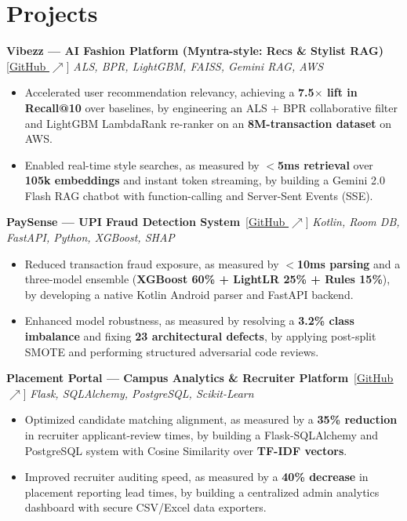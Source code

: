 \documentclass[9pt]{article}
\newcommand{\ghlink}[1]{\,[\href{#1}{\underline{\footnotesize GitHub $\nearrow$}}]}
\begin{document}
\section{Projects}

\textbf{Vibezz --- AI Fashion Platform (Myntra-style: Recs \& Stylist RAG)}%
\ghlink{https://github.com/chapranishika/Vibezz-Fashionmind}
\hfill{\small\textit{ALS, BPR, LightGBM, FAISS, Gemini RAG, AWS}}
\begin{itemize}
  \item Accelerated user recommendation relevancy, achieving a \textbf{7.5$\times$ lift in Recall@10} over baselines, by engineering an ALS + BPR collaborative filter and LightGBM LambdaRank re-ranker on an \textbf{8M-transaction dataset} on AWS.
  \item Enabled real-time style searches, as measured by \textbf{$<$5ms retrieval} over \textbf{105k embeddings} and instant token streaming, by building a Gemini 2.0 Flash RAG chatbot with function-calling and Server-Sent Events (SSE).
\end{itemize}

\vspace{3pt}
\textbf{PaySense --- UPI Fraud Detection System}%
\ghlink{https://github.com/chapranishika/PaySense-UPIFraud-Detection}
\hfill{\small\textit{Kotlin, Room DB, FastAPI, Python, XGBoost, SHAP}}
\begin{itemize}
  \item Reduced transaction fraud exposure, as measured by \textbf{$<$10ms parsing} and a three-model ensemble (\textbf{XGBoost 60\% + LightLR 25\% + Rules 15\%}), by developing a native Kotlin Android parser and FastAPI backend.
  \item Enhanced model robustness, as measured by resolving a \textbf{3.2\% class imbalance} and fixing \textbf{23 architectural defects}, by applying post-split SMOTE and performing structured adversarial code reviews.
\end{itemize}

\vspace{3pt}
\textbf{Placement Portal --- Campus Analytics \& Recruiter Platform}%
\ghlink{https://github.com/chapranishika/Placement_Portal}
\hfill{\small\textit{Flask, SQLAlchemy, PostgreSQL, Scikit-Learn}}
\begin{itemize}
  \item Optimized candidate matching alignment, as measured by a \textbf{35\% reduction} in recruiter applicant-review times, by building a Flask-SQLAlchemy and PostgreSQL system with Cosine Similarity over \textbf{TF-IDF vectors}.
  \item Improved recruiter auditing speed, as measured by a \textbf{40\% decrease} in placement reporting lead times, by building a centralized admin analytics dashboard with secure CSV/Excel data exporters.
\end{itemize}
\end{document}
